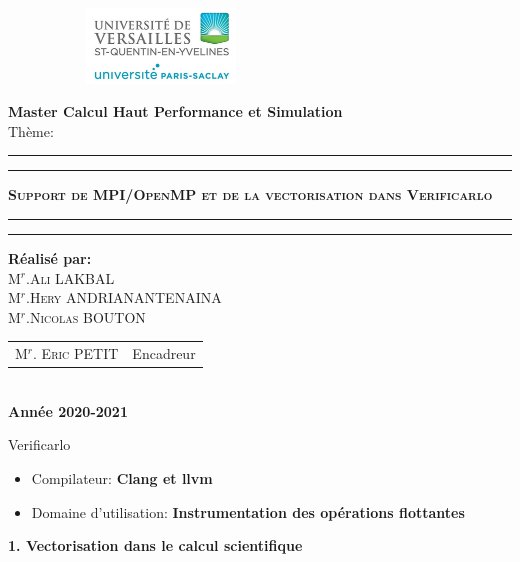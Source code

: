 \documentclass{beamer}
\begin{document}
\maketitle
\begin{center}
\begin{figure}[!htbp]
\begin{center}
\includegraphics[width=6cm,height=2cm]{../ressources/a.jpeg}
\end{center}
\end{figure}


{\Large {\bf { Master Calcul Haut Performance et Simulation }}}\\
{\huge {Thème:}}\\
\hrule
\hrule
{}
{\huge \textbf{\textsc{ Support de MPI/OpenMP et de la vectorisation dans Verificarlo}}}\\
\hrule
\hrule
{}
{\textbf{\Large{Réalisé par:}}}\\
{\large\textsc{M$^{r}$.Ali LAKBAL}}\\
{\large\textsc{M$^{r}$.Hery ANDRIANANTENAINA}}\\
{\large\textsc{M$^{r}$.Nicolas BOUTON}}\\
{\large
\begin{tabular}{ll}
M$^{r}$. \textsc{Eric} PETIT  & Encadreur    \\
\end{tabular}
}\\
{\Large\textbf{ Année 2020-2021}}
\end{center}

\begin{frame}{Verificarlo}
    \begin{itemize}
        \item Compilateur: \textbf{ Clang et llvm} 
        \item Domaine d'utilisation: \textbf{ Instrumentation des opérations flottantes}
    \end{itemize}
    
\textbf{1. Vectorisation dans le calcul scientifique}
    
\end{frame}
\end{document}
